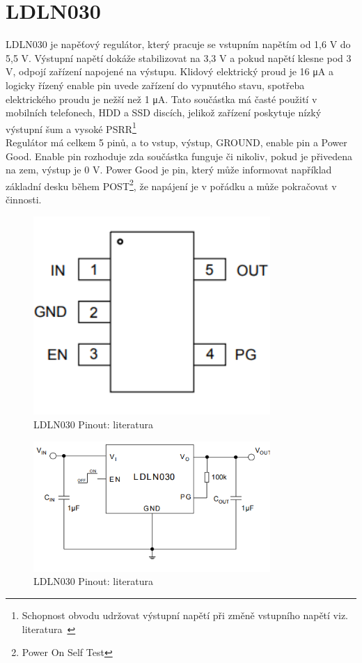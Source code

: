 \documentclass[a4paper, 12pt]{report}
\begin{document}
    \section{LDLN030}
    LDLN030 je napěťový regulátor, který pracuje se vstupním napětím od 1,6 V do 5,5 V. Výstupní napětí dokáže stabilizovat na 3,3 V a pokud napětí klesne pod 3 V, odpojí zařízení napojené na výstupu.
    Klidový elektrický proud je 16 \si{\micro A} a logicky řízený enable pin uvede zařízení do vypnutého stavu, spotřeba elektrického proudu je nežší než 1 \si{\micro A}.
    Tato součástka má časté použití v mobilních telefonech, HDD a SSD discích, jelikož zařízení poskytuje nízký výstupní šum a vysoké PSRR\footnote{Schopnost obvodu udržovat výstupní napětí při změně vstupního napětí viz. literatura~\cite{PSRR}} \\
    Regulátor má celkem 5 pinů, a to vstup, výstup, GROUND, enable pin a Power Good.
    Enable pin rozhoduje zda součástka funguje či nikoliv, pokud je přivedena na zem, výstup je 0 V. Power Good je pin, který může informovat například základní desku během POST\footnote{Power On Self Test}, že napájení je v pořádku a může pokračovat v činnosti.
    \begin{figure}[h]
        \centering
        \includegraphics[width=9cm]{images/ldln030_datasheet}
        \caption{LDLN030 Pinout: literatura~\cite{stabilizator}}
        \label{fig:ldln030_datasheet}
    \end{figure}

    \begin{figure}[h]
        \centering
        \includegraphics[width=9cm]{images/ldln030_datasheet2}
        \caption{LDLN030 Pinout: literatura~\cite{stabilizator}}
        \label{fig:ldln030_datasheet2}
    \end{figure}
\end{document}
